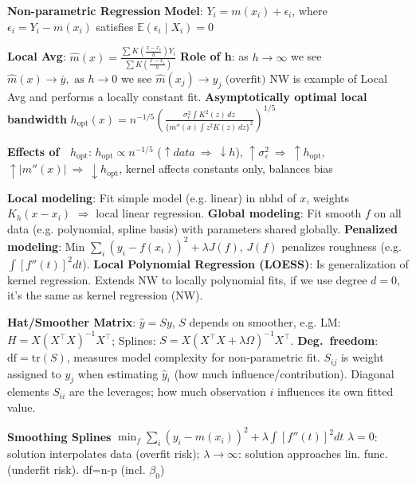 \documentclass[9pt]{article}
\renewcommand\small{\footnotesize}
\newcommand{\toptopic}[1]{\textbf{{#1}}}
\newcommand{\topic}[1]{\small{\textbf{\textcolor{Sepia}{#1}}}}
\begin{document}
\begin{multicols*}{3}
\toptopic{Non-parametric Regression}
\topic{Model}: $Y_i = m(x_i) + \epsilon_i$, where $\epsilon_i = Y_i - m(x_i)$ satisfies $\mathbb{E}(\epsilon_i \mid X_i) = 0$

\topic{Local Avg}: $\hat{m}(x) = \frac{\sum K(\frac{x - x_i}{h}) Y_i}{\sum K(\frac{x - x_i}{h})}$ \topic{Role of h}: as $h \rightarrow \infty$ we see $\hat{m}(x) \rightarrow \bar{y}, \text{ as } h \rightarrow 0$ we see $\hat{m}(x_j) \rightarrow y_j \text{  (overfit)}$ NW is example of Local Avg and performs a locally constant fit.
\topic{Asymptotically optimal local bandwidth} 
$h_{\mathrm{opt}}(x) = n^{-1/5} \left( \frac{\sigma_\epsilon^{2} \int K^{2}(z) \, dz}{\{ m''(x) \int z^{2} K(z) \, dz \}^{2}} \right)^{1/5}$

\topic{Effects of \ $h_{\mathrm{opt}}$}: $h_{\mathrm{opt}} \propto n^{-1/5}$ ($\uparrow data  \ \Rightarrow \ \downarrow h$), $\uparrow \sigma_\varepsilon^2 \ \Rightarrow \ \uparrow  h_{\mathrm{opt}} $, $\uparrow |m''(x)| \ \Rightarrow  \  \downarrow h_{\mathrm{opt}}$, kernel affects constants only, balances bias

\topic{Local modeling}: Fit simple model (e.g. linear) in nbhd of $x$, weights $K_h(x - x_i)$ $\Rightarrow$ local linear regression.  
\topic{Global modeling}: Fit smooth $f$ on all data (e.g. polynomial, spline basis) with parameters shared globally.  
\topic{Penalized modeling}: Min $\sum_i (y_i - f(x_i))^2 + \lambda J(f)$, $J(f)$ penalizes roughness (e.g. $\int [f''(t)]^2 dt$).  
\topic{Local Polynomial Regression (LOESS)}: Is generalization of kernel regression. Extends NW to locally polynomial fits, if we use degree $d=0$, it's the same as kernel regression (NW).

\topic{Hat/Smoother Matrix}: $\hat{y} = Sy$, $S$ depends on smoother, e.g. LM: $H = X(X^\top X )^{-1}X^\top$;
Splines: $S = X(X^\top X + \lambda \Omega)^{-1}X^\top$.  
\topic{Deg.\ freedom}: $\mathrm{df} = \mathrm{tr}(S)$, measures model complexity for non-parametric fit. $S_{ij}$ is weight assigned to $y_j$ when estimating $\hat{y}_i$ (how much influence/contribution). Diagonal elements $S_{ii}$ are the leverages; how much observation $i$ influences its own fitted value. 


\toptopic{Smoothing Splines} $\min_f \sum_i (y_i - m(x_i))^2 + \lambda \int [f''(t)]^2 dt$
$\lambda=0$: solution interpolates data (overfit risk); $\lambda \to \infty$: solution approaches lin. func. (underfit risk). df=n-p (incl. $\beta_0$)


\end{multicols*}
\end{document}
